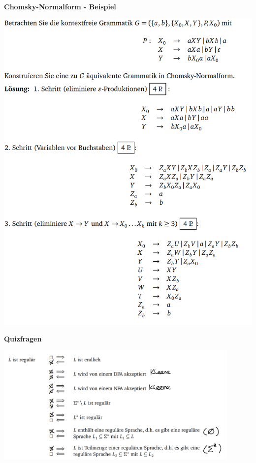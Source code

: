 \documentclass[11pt,a4paper]{article}
\begin{document}
{\pagebreak

{\Large \textbf{Chomsky-Normalform - Beispiel}

\begin{center}
\includegraphics[scale=1]{Bilder/chomskybsp}
\end{center}

\pagebreak

{\Large \textbf{Quizfragen}}

\begin{center}
\includegraphics[width=12cm]{Bilder/quiz1}
\end{center}

}}
\end{document}
